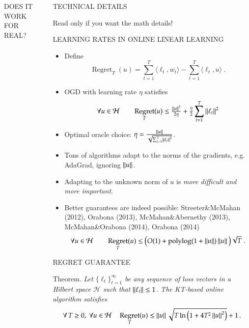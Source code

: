 \documentclass[final,t,serif,mathserif]{beamer}
\renewcommand{\H}{\mathcal{H}}  %
\DeclareMathOperator{\Regret}{Regret}
\DeclareMathOperator{\polylog}{polylog}
\def\blockspaceb{\vspace{0.05cm}}
\def\blockspacec{\vspace{0.25cm}}
\begin{document}
\begin{frame}{}
\begin{columns}[t]
\begin{column}{.33\linewidth}
\begin{block}{DOES IT WORK FOR REAL?}
       \blockspaceb
       
    \end{block}
\end{column}


\begin{column}{.33\linewidth}

    \begin{block}{TECHNICAL DETAILS}
    \begin{minipage}{.98\linewidth}

    \blockspacec
    
    Read only if you want the math details!
    
    \blockspacec

    \begin{block}{LEARNING RATES IN ONLINE LINEAR LEARNING}
    \blockspacec
    
    \begin{itemize}
      \item Define
      \[
        \Regret_T(u) = \sum_{t=1}^T \langle \ell_t, w_t \rangle - \sum_{t=1}^T \langle \ell_t, u \rangle  \; .
      \]
      \item OGD with learning rate $\eta$ satisfies
	\[
	\forall u \in \H \qquad \Regret_T(u) \le \tfrac{\norm{u}^2}{2\eta} + \tfrac{\eta}{2} \sum_{t=1}^T \norm{\ell_t}^2
	\]
      \item Optimal oracle choice: $\eta = \frac{\left\|{u}\right\|}{\sqrt{\sum_{t=1}^T \left\|{\ell_t}\right\|^2}}$.
      \item Tons of algorithms adapt to the norms of the gradients, e.g. AdaGrad, ignoring $\left\|{u}\right\|$.
      \item Adapting to the unknown norm of $u$ is \emph{more difficult and more important}.
      \item Better guarantees are indeed possible: Streeter\&McMahan (2012), Orabona (2013), McMahan\&Abernethy (2013), McMahan\&Orabona (2014), Orabona (2014) 
	\[
	\forall u \in \H \qquad \Regret_T(u) \le \big(O(1)+\polylog(1 + \norm{u})\norm{u} \big) \sqrt{T} \; .
	\]
    \end{itemize}
    
    \blockspacec
    \end{block}

    \begin{block}{REGRET GUARANTEE}
    \blockspacec
    
    \alert{Theorem.} \emph{
	Let $\{\ell_t\}_{t=1}^\infty$ be any sequence of loss vectors
	in a Hilbert space $\H$ such that $\left\|{\ell_t}\right\| \le 1$.
	The KT-based online algorithm satisfies
	$$
	\forall \, T \ge 0, \
	\forall u \in \H \quad
	\Regret_T(u) \le \norm{u} \sqrt{T \ln\left(1 + 4T^2 \norm{u}^2 \right)} + 1 \, .
	$$
    }


\end{block}
\end{minipage}
\end{block}
\end{column}
\end{columns}
\end{frame}
\end{document}
